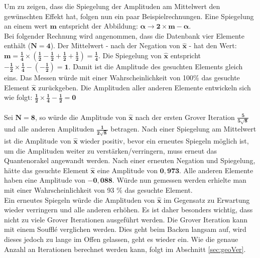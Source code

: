 \noindent
Um zu zeigen, dass die Spiegelung der Amplituden am Mittelwert den gewünschten Effekt hat, folgen nun ein paar Beispielrechnungen. Eine Spiegelung an einem wert $\mathbf{m}$ entspricht der Abbildung: $\mathbf{\alpha \rightarrow 2 \times m - \alpha}$. \\
Bei folgender Rechnung wird angenommen, dass die Datenbank vier Elemente enthält ($\mathbf{N=4}$). Der Mittelwert - nach der Negation von $\mathbf{\hat x}$ - hat den Wert: $\mathbf{m = \frac{1}{4} \times (\frac{1}{2}- \frac{1}{2}+ \frac{1}{2} +\frac{1}{2}) = \frac{1}{4}}$. Die Spiegelung von $\mathbf{\hat x}$ entspricht $\mathbf{-\frac{1}{2} \times \frac{1}{4} - (-\frac{1}{2}) = 1}$. Damit ist die Amplitude des gesuchten Elements gleich eins. Das Messen würde mit einer Wahrscheinlichkeit von 100\%  das gesuchte Element $\mathbf{\hat x}$ zurückgeben. Die Amplituden aller anderen Elemente entwickeln sich wie folgt: $\mathbf{\frac{1}{2} \times \frac{1}{4} - \frac{1}{2} = 0}$
\\ \\
Sei $\mathbf{N = 8}$, so würde die Amplitude von $\mathbf{ \hat x}$ nach der ersten Grover Iteration $\mathbf{\frac{5}{5\sqrt 8}}$ und alle anderen Amplituden $\mathbf{\frac{1}{2\sqrt 8}}$ betragen. Nach einer Spiegelung am Mittelwert ist die Amplitude von $\mathbf{\hat x}$ wieder positiv, bevor ein erneutes Spiegeln möglich ist, um die Amplituden weiter zu verstärken/verringern, muss erneut das Quantenorakel angewandt werden. Nach einer erneuten Negation und Spiegelung, hätte das gesuchte Element $\mathbf{\hat x}$ eine Amplitude von $\mathbf{0,973}$. Alle anderen Elemente haben eine Amplitude von $\mathbf{-0, 088}$. Würde nun gemessen werden erhielte man mit einer Wahrscheinlichkeit von 93 \% das gesuchte Element.
\\ 
Ein erneutes Spiegeln würde die Amplituden von $\mathbf{\hat{x}}$ im Gegensatz zu Erwartung wieder verringern und alle anderen erhöhen. Es ist daher besonders wichtig, dass nicht zu viele Grover Iterationen ausgeführt werden. Die Grover Iteration kann mit einem Souffl\'{e} verglichen werden. Dies geht beim Backen langsam auf, wird dieses jedoch zu lange im Offen gelassen, geht es wieder ein. Wie die genaue Anzahl an Iterationen berechnet werden kann, folgt im Abschnitt \ref{sec:geoVer}.

